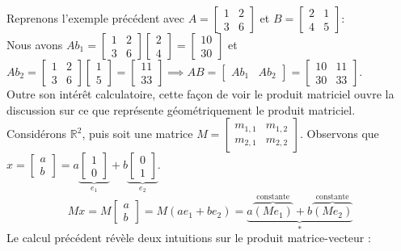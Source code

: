 \documentclass{article}
\newcommand{\R}{\mathbb{R}}
\begin{document}
\noindent Reprenons l'exemple précédent avec $A = \begin{bmatrix} 1 & 2 \\ 3 & 6 \end{bmatrix}$ et $B = \begin{bmatrix} 2 & 1 \\ 4 & 5 \end{bmatrix}$: \\
Nous avons $Ab_1 = \begin{bmatrix} 1 & 2 \\ 3 & 6 \end{bmatrix} \begin{bmatrix} 2 \\ 4\end{bmatrix} = \begin{bmatrix} 10 \\ 30 \end{bmatrix}$ et $Ab_2 = \begin{bmatrix} 1 & 2 \\ 3 & 6 \end{bmatrix} \begin{bmatrix} 1 \\ 5\end{bmatrix} = \begin{bmatrix} 11 \\ 33 \end{bmatrix} \implies AB = \begin{bmatrix} Ab_1 & Ab_2 \end{bmatrix} = \begin{bmatrix} 10 & 11 \\ 30 & 33 \end{bmatrix}$. \\

\noindent Outre son intérêt calculatoire, cette façon de voir le produit matriciel ouvre la discussion sur ce que représente géométriquement le produit matriciel.\\
Considérons $\R^2$, puis soit une matrice $M = \begin{bmatrix}
m_{1,1} & m_{1,2} \\ m_{2,1} & m_{2,2}
\end{bmatrix}$. Observons que $x = \begin{bmatrix}a \\ b \end{bmatrix} = a\underbrace{\begin{bmatrix}1 \\ 0 \end{bmatrix}}_{e_1}+b\underbrace{\begin{bmatrix}0 \\ 1 \end{bmatrix}}_{e_2}$.\\
$$Mx = M\begin{bmatrix}a \\ b \end{bmatrix} = M\left(ae_1 + be_2\right) = \underbrace{a\overbrace{(Me_1)}^{\text{constante}} + b\overbrace{(Me_2)}^{\text{constante}}}_{*} $$
Le calcul précédent révèle deux intuitions sur le produit matrice-vecteur :\\
\end{document}
